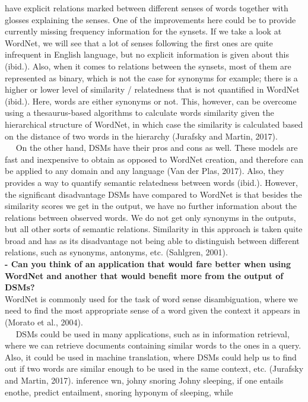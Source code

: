 \documentclass[11pt]{article}
\begin{document}
have explicit relations marked between different senses of words
together with glosses explaining the senses. One of the improvements
here could be to provide currently missing frequency information for the
synsets. If we take a look at WordNet, we will see that a lot of senses
following the first ones are quite infrequent in English language, but
no explicit information is given about this (ibid.). Also, when it comes
to relations between the synsets, most of them are represented as
binary, which is not the case for synonyms for example; there is a
higher or lower level of similarity / relatedness that is not quantified
in WordNet (ibid.). Here, words are either synonyms or not. This,
however, can be overcome using a thesaurus-based algorithms to calculate
words similarity given the hierarchical structure of WordNet, in which
case the similarity is calculated based on the distance of two words in
the hierarchy (Jurafsky and Martin, 2017).\\
   On the other hand, DSMs have their pros and cons as well. These
models are fast and inexpensive to obtain as opposed to WordNet
creation, and therefore can be applied to any domain and any language
(Van der Plas, 2017). Also, they provides a way to quantify semantic
relatedness between words (ibid.). However, the significant disadvantage
DSMs have compared to WordNet is that besides the similarity scores we
get in the output, we have no further information about the relations
between observed words. We do not get only synonyms in the outputs, but
all other sorts of semantic relations. Similarity in this approach is
taken quite broad and has as its disadvantage not being able to
distinguish between different relations, such as synonyms, antonyms,
etc. (Sahlgren, 2001).\\
 \textbf{- Can you think of an application that would fare better when
using WordNet and another that would benefit more from the output of
DSMs?}\\
WordNet is commonly used for the task of word sense disambiguation,
where we need to find the most appropriate sense of a word given the
context it appears in (Morato et al., 2004).\\
   DSMs could be used in many applications, such as in information
retrieval, where we can retrieve documents containing similar words to
the ones in a query. Also, it could be used in machine translation,
where DSMs could help us to find out if two words are similar enough to
be used in the same context, etc. (Jurafsky and Martin, 2017). inference
wn, johny snoring Johny sleeping, if one entails enothe, predict
entailment, snoring hyponym of sleeping, while
\end{document}
